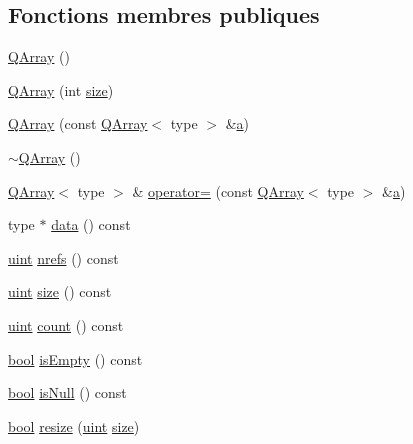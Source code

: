 \subsection*{Fonctions membres publiques}
\begin{DoxyCompactItemize}
\item 
\hyperlink{class_q_array_a3adbced4586880b64115321da1c1fca8}{Q\+Array} ()
\item 
\hyperlink{class_q_array_a034f799d9c3453d8c7e43c499d75a27a}{Q\+Array} (int \hyperlink{class_q_array_a5f9185766dff05b3a1fd43a0722e8fd4}{size})
\item 
\hyperlink{class_q_array_af35399770b255d6736af5abbcc746a86}{Q\+Array} (const \hyperlink{class_q_array}{Q\+Array}$<$ type $>$ \&\hyperlink{060__command__switch_8tcl_ab08ae027fc5777bc4f0629f1b60b35db}{a})
\item 
\hyperlink{class_q_array_a45db24f981ee4b0b2b0504aada681720}{$\sim$\+Q\+Array} ()
\item 
\hyperlink{class_q_array}{Q\+Array}$<$ type $>$ \& \hyperlink{class_q_array_a72ba6a2725a6109e364658414c183595}{operator=} (const \hyperlink{class_q_array}{Q\+Array}$<$ type $>$ \&\hyperlink{060__command__switch_8tcl_ab08ae027fc5777bc4f0629f1b60b35db}{a})
\item 
type $\ast$ \hyperlink{class_q_array_adf35a7f6f9e1dd8d9d14e7f487748d4e}{data} () const 
\item 
\hyperlink{qglobal_8h_a4d3943ddea65db7163a58e6c7e8df95a}{uint} \hyperlink{class_q_array_aeb7ffbbc1e76535969909ad81f743275}{nrefs} () const 
\item 
\hyperlink{qglobal_8h_a4d3943ddea65db7163a58e6c7e8df95a}{uint} \hyperlink{class_q_array_a5f9185766dff05b3a1fd43a0722e8fd4}{size} () const 
\item 
\hyperlink{qglobal_8h_a4d3943ddea65db7163a58e6c7e8df95a}{uint} \hyperlink{class_q_array_a25bc04320471fbfa29e29449fbf5a0d0}{count} () const 
\item 
\hyperlink{qglobal_8h_a1062901a7428fdd9c7f180f5e01ea056}{bool} \hyperlink{class_q_array_a2cbaa02c65b514fb133ba5bea57be655}{is\+Empty} () const 
\item 
\hyperlink{qglobal_8h_a1062901a7428fdd9c7f180f5e01ea056}{bool} \hyperlink{class_q_array_a87225da4ad72385ab3a4c08777a7d19a}{is\+Null} () const 
\item 
\hyperlink{qglobal_8h_a1062901a7428fdd9c7f180f5e01ea056}{bool} \hyperlink{class_q_array_a9a2194b00734a01338194cfe5abd6736}{resize} (\hyperlink{qglobal_8h_a4d3943ddea65db7163a58e6c7e8df95a}{uint} \hyperlink{class_q_array_a5f9185766dff05b3a1fd43a0722e8fd4}{size})

\end{DoxyCompactItemize}
